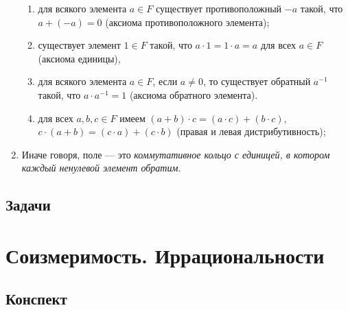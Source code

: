 \begin{enumerate}
\begin{enumerate}[{\bf F}1)]
\item для всякого элемента $a\in F$ существует противоположный $-a$ такой, что $a+(-a)=0$ (аксиома противоположного элемента);
\item существует элемент $1\in F$ такой, что $a\cdot 1=1\cdot a=a$ для всех $a\in F$ (аксиома единицы),
\item для всякого элемента $a\in F$, если $a\ne 0$, то существует обратный $a^{-1}$ такой, что $a\cdot a^{-1}=1$ (аксиома обратного элемента).
\item для всех $a,b,c\in F$ имеем $(a+b)\cdot c=(a\cdot c)+(b\cdot c)$, $c\cdot(a+b)=(c\cdot a)+(c\cdot b)$ (правая и левая дистрибутивность);
\end{enumerate}
\item Иначе говоря, поле --- это \textit{коммутативное кольцо с единицей, в котором каждый ненулевой элемент обратим}.
\end{enumerate}


\subsection*{Задачи}





\section{Соизмеримость. Иррациональности}

\subsection*{Конспект}

